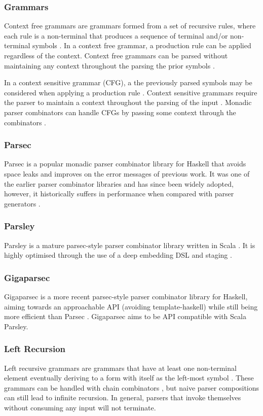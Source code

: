 \documentclass[11pt]{article}
\begin{document}
\subsubsection{Grammars}
Context free grammars are grammars formed from a set of recursive rules, where each rule is a non-terminal that produces a sequence of terminal and/or non-terminal symbols \cite{context}. In a context free grammar, a production rule can be applied regardless of the context. Context free grammars can be parsed without maintaining any context throughout the parsing the prior symbols \cite{parsley}.

In a context sensitive grammar (CFG), a the previously parsed symbols may be considered when applying a production rule \cite{context}. Context sensitive grammars require the parser to maintain a context throughout the parsing of the input \cite{parsley}. Monadic parser combinators can handle CFGs by passing some context through the combinators \cite{parsley}.

\subsubsection{Parsec}
Parsec \cite{parsec} is a popular monadic parser combinator library for Haskell that avoids space leaks and improves on the error messages of previous work. It was one of the earlier parser combinator libraries and has since been widely adopted, however, it historically suffers in performance when compared with parser generators \cite{staged-selective}.

\subsubsection{Parsley}
Parsley is a mature parsec-style parser combinator library written in Scala \cite{parsley}. It is highly optimised through the use of a deep embedding DSL and staging \cite{staged-selective}. 

\subsubsection{Gigaparsec}
Gigaparsec is a more recent parsec-style parser combinator library for Haskell, aiming towards an approachable API (avoiding template-haskell) while still being more efficient than Parsec \cite{gigaparsec}. Gigaparsec aims to be API compatible with Scala Parsley.

\subsubsection{Left Recursion}
Left recursive grammars are grammars that have at least one non-terminal element eventually deriving to a form with itself as the left-most symbol \cite{left-recursive}. These grammars can be handled with chain combinators \cite{design-patterns}, but naive parser compositions can still lead to infinite recursion. In general, parsers that invoke themselves without consuming any input will not terminate.
\end{document}
